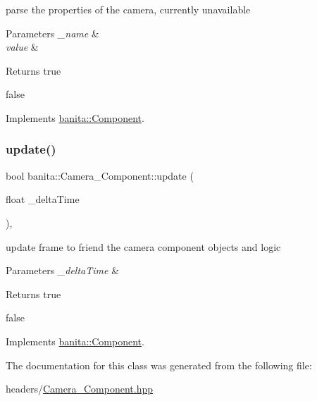 parse the properties of the camera, currently unavailable 


\begin{DoxyParams}{Parameters}
{\em \+\_\+name} & \\
\hline
{\em value} & \\
\hline
\end{DoxyParams}
\begin{DoxyReturn}{Returns}
true 

false 
\end{DoxyReturn}


Implements \mbox{\hyperlink{classbanita_1_1_component_a619154ef2bed8e4493413bdef6117716}{banita\+::\+Component}}.

\mbox{\label{classbanita_1_1_camera___component_a177f9d18f146b83d6dc08eab3c576cae}} 
\subsubsection{\texorpdfstring{update()}{update()}}
{\footnotesize\ttfamily bool banita\+::\+Camera\+\_\+\+Component\+::update (\begin{DoxyParamCaption}\item[{float}]{\+\_\+delta\+Time }\end{DoxyParamCaption})\hspace{0.3cm}{\ttfamily [override]}, {\ttfamily [virtual]}}



update frame to friend the camera component objects and logic 


\begin{DoxyParams}{Parameters}
{\em \+\_\+delta\+Time} & \\
\hline
\end{DoxyParams}
\begin{DoxyReturn}{Returns}
true 

false 
\end{DoxyReturn}


Implements \mbox{\hyperlink{classbanita_1_1_component_ae8f9d11dc8e3c920d6d40146668c429b}{banita\+::\+Component}}.



The documentation for this class was generated from the following file\+:\begin{DoxyCompactItemize}
\item 
headers/\mbox{\hyperlink{_camera___component_8hpp}{Camera\+\_\+\+Component.\+hpp}}\end{DoxyCompactItemize}
